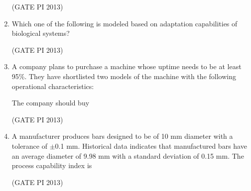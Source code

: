 \documentclass[journal,12pt,onecolumn]{IEEEtran}
\theoremstyle{remark}
\begin{document}
\begin{enumerate}
\hfill (GATE PI 2013)

\item Which one of the following is modeled based on adaptation capabilities of biological systems? \\
\begin{enumerate}
\end{enumerate}

\hfill (GATE PI 2013)

\item A company plans to purchase a machine whose uptime needs to be at least 95\%. They have shortlisted two models of the machine with the following operational characteristics: 

\medskip


The company should buy
\begin{enumerate}
\end{enumerate}

\hfill (GATE PI 2013)

\item A manufacturer produces bars designed to be of 10 mm diameter with a tolerance of $\pm$0.1 mm. Historical data indicates that manufactured bars have an average diameter of 9.98 mm with a standard deviation of 0.15 mm. The process capability index is
\begin{enumerate}
\end{enumerate}

\hfill (GATE PI 2013)


\end{enumerate}
\end{document}

